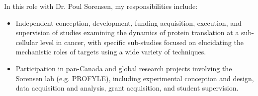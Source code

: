 \documentclass[11pt]{article}
\begin{document}
\begin{addmargin}[7.5em]{2em}%
	In this role with Dr. Poul Sorensen, my responsibilities include:
	\begin{itemize}
		\item Independent conception, development, funding acquisition, execution, and supervision of studies examining the dynamics of protein translation at a sub-cellular level in cancer, with specific sub-studies focused on elucidating the mechanistic roles of targets using a wide variety of techniques.
		\item Participation in pan-Canada and global research projects involving the Sorensen lab (e.g. PROFYLE), including experimental conception and design, data acquisition and analysis, grant acquisition, and student supervision.
	\end{itemize}
\end{addmargin}
\end{document}
